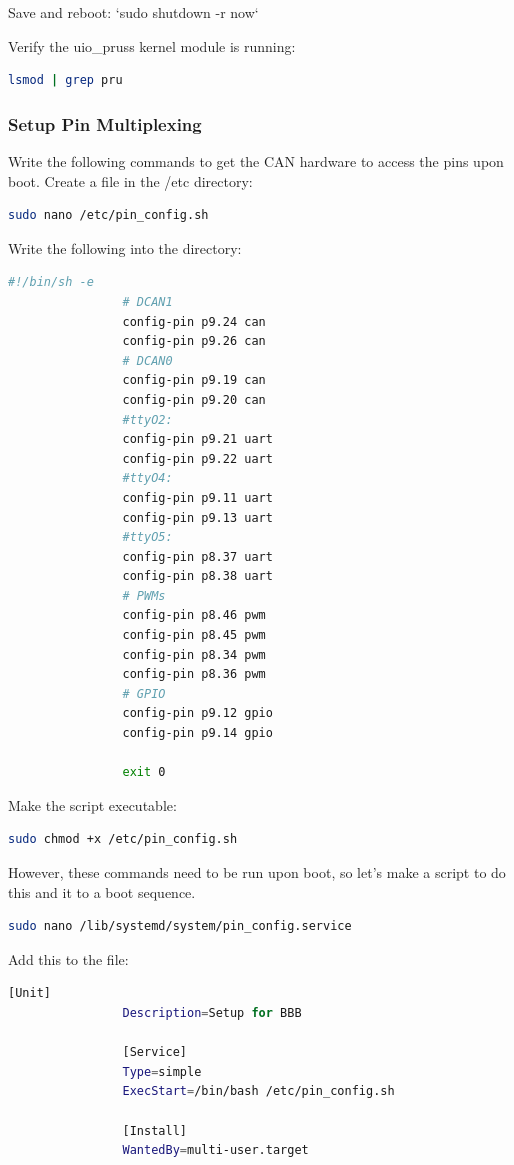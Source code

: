             Save and reboot: `sudo shutdown -r now`
    
            Verify the uio\_pruss kernel module is running:
            \begin{lstlisting}[language=bash, autogobble=true]
                lsmod | grep pru
            \end{lstlisting}

        \subsubsection{Setup Pin Multiplexing}
            Write the following commands to get the CAN hardware to access the pins upon boot. 
            Create a file in the /etc directory:
    
            \begin{lstlisting}[language=bash, autogobble=true]
                sudo nano /etc/pin_config.sh
            \end{lstlisting}
                Write the following into the directory:
            \begin{lstlisting}[language=bash, autogobble=true]
                #!/bin/sh -e
                # DCAN1
                config-pin p9.24 can
                config-pin p9.26 can 
                # DCAN0
                config-pin p9.19 can
                config-pin p9.20 can
                #ttyO2:
                config-pin p9.21 uart
                config-pin p9.22 uart
                #ttyO4:
                config-pin p9.11 uart
                config-pin p9.13 uart
                #ttyO5:
                config-pin p8.37 uart
                config-pin p8.38 uart
                # PWMs
                config-pin p8.46 pwm
                config-pin p8.45 pwm
                config-pin p8.34 pwm
                config-pin p8.36 pwm
                # GPIO
                config-pin p9.12 gpio
                config-pin p9.14 gpio
    
                exit 0
            \end{lstlisting}
            Make the script executable:
            \begin{lstlisting}[language=bash, autogobble=true]
                sudo chmod +x /etc/pin_config.sh
            \end{lstlisting}
            However, these commands need to be run upon boot, so let's make a script to do this and it to   a   boot sequence.
    
            \begin{lstlisting}[language=bash, autogobble=true]
                sudo nano /lib/systemd/system/pin_config.service
            \end{lstlisting}
            Add this to the file:
            \begin{lstlisting}[language=bash, autogobble=true]
                [Unit]
                Description=Setup for BBB
    
                [Service]
                Type=simple
                ExecStart=/bin/bash /etc/pin_config.sh
    
                [Install]
                WantedBy=multi-user.target
            \end{lstlisting}
    
